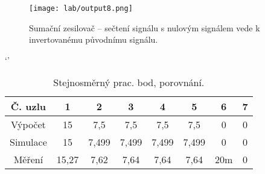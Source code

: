 \begin{figure}[h!]
    \centering
    \texttt{[image: lab/output8.png]}
    \caption{Sumační zesilovač -- sečtení signálu s nulovým signálem vede k invertovanému původnímu signálu.}
    \label{fig:lab-output8-png}
\end{figure}



\begin{table}[h!]
    \centering
    \def\arraystretch{1.4}`'
    \caption{Stejnosměrný prac. bod, porovnání.}
    \begin{tabular}{|c|c|c|c|c|c|c|c|}
        \hline
            Č. uzlu & 1 & 2 & 3 & 4 & 5 &  6 &  7 \\
        \hline
            Výpočet & 15 & 7,5 & 7,5 & 7,5 & 7,5 &  0 &  0 \\
            Simulace & 15 & 7,499 & 7,499 & 7,499 & 7,499 &  0 &  0 \\
            Měření & 15,27 & 7,62 & 7,64 & 7,64 & 7,64 &  20m &  0 \\
        \hline
    \end{tabular}
    \label{tab:dc-bod}
\end{table}